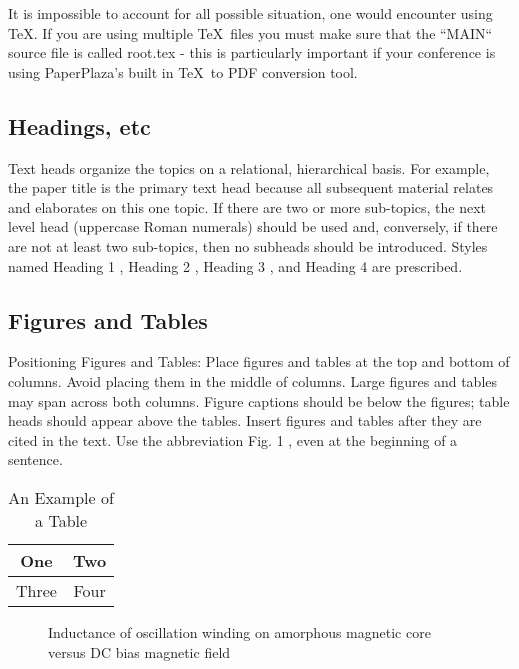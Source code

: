 \documentclass[letterpaper, 10 pt, conference]{ieeeconf}  %
\begin{document}
It is impossible to account for all possible situation, one would encounter using \TeX. If you are using multiple \TeX\ files you must make sure that the ``MAIN`` source file is called root.tex - this is particularly important if your conference is using PaperPlaza's built in \TeX\ to PDF conversion tool.

\subsection{Headings, etc}

Text heads organize the topics on a relational, hierarchical basis. For example, the paper title is the primary text head because all subsequent material relates and elaborates on this one topic. If there are two or more sub-topics, the next level head (uppercase Roman numerals) should be used and, conversely, if there are not at least two sub-topics, then no subheads should be introduced. Styles named  Heading 1 ,  Heading 2 ,  Heading 3 , and  Heading 4  are prescribed.

\subsection{Figures and Tables}

Positioning Figures and Tables: Place figures and tables at the top and bottom of columns. Avoid placing them in the middle of columns. Large figures and tables may span across both columns. Figure captions should be below the figures; table heads should appear above the tables. Insert figures and tables after they are cited in the text. Use the abbreviation  Fig. 1 , even at the beginning of a sentence.

\begin{table}[h]
\caption{An Example of a Table}
\label{table_example}
\begin{center}
\begin{tabular}{|c||c|}
\hline
One & Two\\
\hline
Three & Four\\
\hline
\end{tabular}
\end{center}
\end{table}


   \begin{figure}[thpb]
      \centering
      \caption{Inductance of oscillation winding on amorphous
       magnetic core versus DC bias magnetic field}
      \label{figurelabel}
   \end{figure}
   
\end{document}
